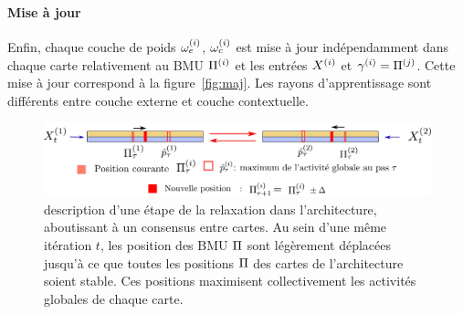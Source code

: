 \paragraph{Mise à jour}
Enfin, chaque couche de poids $\omega_{e}^{({i})}$, $\omega_c^{({i})}$ est mise à jour indépendamment dans chaque carte relativement au BMU $\Pi^{({i})}$ et les entrées $X^{({i})}$ et $\gamma^{({i})} = \Pi^{({j})}$. Cette mise à jour correspond à la figure~\ref{fig:maj}. Les rayons d'apprentissage sont différents entre couche externe et couche contextuelle.

\begin{figure}
\centering
\includegraphics[width=\textwidth]{relaxation_2maps.pdf}
\caption{description d'une étape de la relaxation dans l'architecture, aboutissant à un consensus entre cartes. Au sein d'une même itération $t$, les position des BMU $\Pi$ sont légèrement déplacées jusqu'à ce que toutes les positions $\Pi$ des cartes de l'architecture soient stable. Ces positions maximisent collectivement les activités globales de chaque carte. \label{fig:relax}}
\end{figure}

